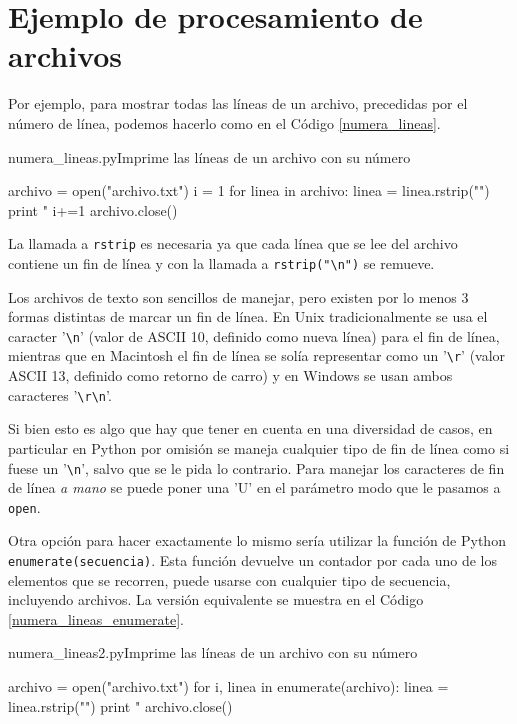 \section{Ejemplo de procesamiento de archivos}

Por ejemplo, para mostrar todas las líneas de un archivo,
precedidas por el número de línea, podemos hacerlo como en el Código \ref{numera_lineas}.

\begin{codigo}{numera\_lineas.py}{Imprime las líneas de un archivo con su número}
\label{numera_lineas}
\begin{codigo-python}
archivo = open("archivo.txt")
i = 1
for linea in archivo:
    linea = linea.rstrip("\n")
    print "%
    i+=1
archivo.close()
\end{codigo-python}
\end{codigo}

La llamada a \lstinline!rstrip! es necesaria ya que cada línea que se lee del
archivo contiene un fin de línea y con la llamada a
\lstinline!rstrip("\n")! se remueve.

\begin{sabias_que}
Los archivos de texto son sencillos de manejar, pero existen por lo menos 3
formas distintas de marcar un fin de línea. En Unix tradicionalmente se usa
el caracter '\verb!\n!' (valor de ASCII 10, definido como nueva línea) para
el fin de línea, mientras que en Macintosh el fin de línea se solía
representar como un '\verb!\r!' (valor ASCII 13, definido como retorno de
carro) y en Windows se usan ambos caracteres '\verb!\r\n!'. 

Si bien esto es algo que hay que tener en cuenta en una diversidad de
casos, en particular en Python por omisión se maneja cualquier tipo de fin
de línea como si fuese un '\verb!\n!', salvo que se le pida lo contrario.
Para manejar los caracteres de fin de línea \textit{a mano} se puede poner
una 'U' en el parámetro modo que le pasamos a \lstinline!open!.
\end{sabias_que}

Otra opción para hacer exactamente lo mismo sería utilizar la función de
Python \lstinline!enumerate(secuencia)!.  Esta función devuelve un contador
por cada uno de los elementos que se recorren, puede usarse con cualquier
tipo de secuencia, incluyendo archivos.  La versión equivalente se muestra
en el Código \ref{numera_lineas_enumerate}.

\begin{codigo}{numera\_lineas2.py}{Imprime las líneas de un archivo con su número}
\label{numera_lineas_enumerate}
\begin{codigo-python}
archivo = open("archivo.txt")
for i, linea in enumerate(archivo):
    linea = linea.rstrip("\n")
    print "%
archivo.close()
\end{codigo-python}
\end{codigo}

